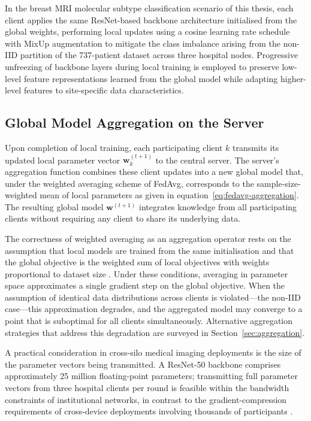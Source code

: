 In the breast MRI molecular subtype classification scenario of this thesis,
each client applies the same ResNet-based backbone architecture initialised
from the global weights, performing local updates using a cosine learning rate
schedule with MixUp augmentation to mitigate the class imbalance arising from
the non-IID partition of the 737-patient dataset across three hospital nodes.
Progressive unfreezing of backbone layers during local training is employed to
preserve low-level feature representations learned from the global model while
adapting higher-level features to site-specific data characteristics.


\subsection{Global Model Aggregation on the Server}
\label{sec:global-aggregation}

Upon completion of local training, each participating client $k$ transmits its
updated local parameter vector $\mathbf{w}_k^{(t+1)}$ to the central server.
The server's aggregation function combines these client updates into a new
global model that, under the weighted averaging scheme of FedAvg, corresponds
to the sample-size-weighted mean of local parameters as given in
equation~\eqref{eq:fedavg-aggregation}.
The resulting global model $\mathbf{w}^{(t+1)}$ integrates knowledge from all
participating clients without requiring any client to share its underlying
data.

The correctness of weighted averaging as an aggregation operator rests on the
assumption that local models are trained from the same initialisation and that
the global objective is the weighted sum of local objectives with weights
proportional to dataset size \cite{mcmahan2017communication}.
Under these conditions, averaging in parameter space approximates a single
gradient step on the global objective.
When the assumption of identical data distributions across clients is
violated---the non-IID case---this approximation degrades, and the aggregated
model may converge to a point that is suboptimal for all clients
simultaneously.
Alternative aggregation strategies that address this degradation are surveyed
in Section~\ref{sec:aggregation}.

A practical consideration in cross-silo medical imaging deployments is the
size of the parameter vectors being transmitted.
A ResNet-50 backbone comprises approximately 25 million floating-point
parameters; transmitting full parameter vectors from three hospital clients per
round is feasible within the bandwidth constraints of institutional networks,
in contrast to the gradient-compression requirements of cross-device
deployments involving thousands of participants
\cite{kairouz2021advances,rieke2020future}.


